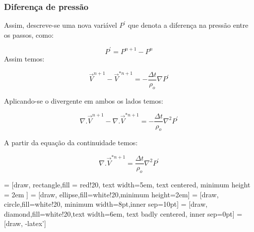 \documentclass[xcolor=dvipsnames,10pt,aspectratio=169]{beamer}
\begin{document}
	\begin{frame}
		\frametitle{Diferença de pressão}
		\flushleft
		Assim, descreve-se uma nova variável $ P^\prime $ que denota a diferença na pressão entre os passos, como:
		
		\begin{equation}
		P^\prime = P^{n + 1} - P^n
		\end{equation}
		Assim temos:
		
		\begin{equation}
		\vec{V}^{n+1} - \vec{V}^{\ast{n + 1}} = - \frac{\Delta t}{\rho_o} \nabla P^\prime
		\end{equation}
		
		Aplicando-se o divergente em ambos os lados temos:
		
		\begin{equation}
		\nabla . \vec{V}^{n+1} - \nabla .\vec{V}^{\ast{n + 1}} = - \frac{\Delta t}{\rho_o} \nabla^2 P^\prime
		\end{equation}
		
		A partir da equação da continuidade temos:
		
		\begin{equation}
		\nabla .\vec{V}^{\ast{n + 1}} = \frac{\Delta t}{\rho_o} \nabla^2 P^\prime
		\end{equation}
		
	
	\end{frame}


 = [draw, rectangle,fill = red!20, text width=5em, text centered, minimum height = 2em ]
 = [draw, ellipse,fill=white!20,minimum height=2em]
 = [draw, circle,fill=white!20, minimum width=8pt,inner sep=10pt]
 = [draw, diamond,fill=white!20,text width=6em, text badly centered, inner sep=0pt]
 = [draw, -latex']
\end{document}
